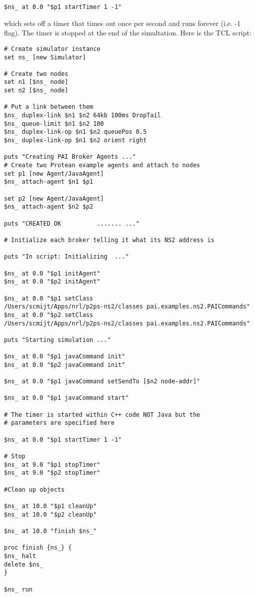 \footnotesize
\begin{verbatim}
$ns_ at 0.0 "$p1 startTimer 1 -1"
\end{verbatim}
\normalsize

\noindent which sets off a timer that times out once per second and runs
forever (i.e. -1 flag).  The timer is stopped at the end of the
simultation. Here is the TCL script:

\footnotesize
\begin{verbatim}
# Create simulator instance
set ns_ [new Simulator]

# Create two nodes
set n1 [$ns_ node]
set n2 [$ns_ node]

# Put a link between them
$ns_ duplex-link $n1 $n2 64kb 100ms DropTail
$ns_ queue-limit $n1 $n2 100
$ns_ duplex-link-op $n1 $n2 queuePos 0.5
$ns_ duplex-link-op $n1 $n2 orient right

puts "Creating PAI Broker Agents ..."   
# Create two Protean example agents and attach to nodes
set p1 [new Agent/JavaAgent]
$ns_ attach-agent $n1 $p1

set p2 [new Agent/JavaAgent]
$ns_ attach-agent $n2 $p2

puts "CREATED OK          ....... ..." 
    
# Initialize each broker telling it what its NS2 address is

puts "In script: Initializing  ..." 
	
$ns_ at 0.0 "$p1 initAgent"
$ns_ at 0.0 "$p2 initAgent"

$ns_ at 0.0 "$p1 setClass 
/Users/scmijt/Apps/nrl/p2ps-ns2/classes pai.examples.ns2.PAICommands"
$ns_ at 0.0 "$p2 setClass 
/Users/scmijt/Apps/nrl/p2ps-ns2/classes pai.examples.ns2.PAICommands"

puts "Starting simulation ..." 

$ns_ at 0.0 "$p1 javaCommand init"
$ns_ at 0.0 "$p2 javaCommand init"

$ns_ at 0.0 "$p1 javaCommand setSendTo [$n2 node-addr]"

$ns_ at 0.0 "$p1 javaCommand start"

# The timer is started within C++ code NOT Java but the
# parameters are specified here

$ns_ at 0.0 "$p1 startTimer 1 -1"

# Stop
$ns_ at 9.0 "$p1 stopTimer"
$ns_ at 9.0 "$p2 stopTimer"

#Clean up objects

$ns_ at 10.0 "$p1 cleanUp"
$ns_ at 10.0 "$p2 cleanUp"

$ns_ at 10.0 "finish $ns_"

proc finish {ns_} {
$ns_ halt
delete $ns_
}

$ns_ run
\end{verbatim}
\normalsize


